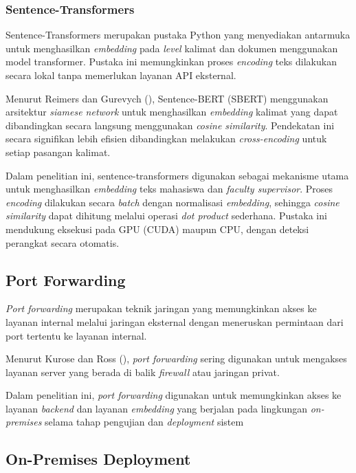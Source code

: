 \subsubsection{Sentence-Transformers}\label{sentence-transformers}

Sentence-Transformers merupakan pustaka Python yang menyediakan antarmuka untuk menghasilkan \textit{embedding} pada \textit{level} kalimat dan dokumen menggunakan model transformer. Pustaka ini memungkinkan proses \textit{encoding} teks dilakukan secara lokal tanpa memerlukan layanan API eksternal.

Menurut Reimers dan Gurevych (\citeyear{reimers2019sbert}), Sentence-BERT (SBERT) menggunakan arsitektur \textit{siamese network} untuk menghasilkan \textit{embedding} kalimat yang dapat dibandingkan secara langsung menggunakan \textit{cosine similarity}. Pendekatan ini secara signifikan lebih efisien dibandingkan melakukan \textit{cross-encoding} untuk setiap pasangan kalimat.

Dalam penelitian ini, sentence-transformers digunakan sebagai mekanisme utama untuk menghasilkan \textit{embedding} teks mahasiswa dan \textit{faculty supervisor}. Proses \textit{encoding} dilakukan secara \textit{batch} dengan normalisasi \textit{embedding}, sehingga \textit{cosine similarity} dapat dihitung melalui operasi \textit{dot product} sederhana. Pustaka ini mendukung eksekusi pada GPU (CUDA) maupun CPU, dengan deteksi perangkat secara otomatis.

\subsection{Port Forwarding}\label{port-forwarding}

\textit{Port forwarding} merupakan teknik jaringan yang memungkinkan akses ke layanan internal melalui jaringan eksternal dengan meneruskan permintaan dari port tertentu ke layanan internal.

Menurut Kurose dan Ross (\citeyear{kurose2017networking}), \textit{port forwarding} sering digunakan untuk mengakses layanan server yang berada di balik \textit{firewall} atau jaringan privat.

Dalam penelitian ini, \textit{port forwarding} digunakan untuk memungkinkan akses ke layanan \textit{backend} dan layanan \textit{embedding} yang berjalan pada lingkungan \textit{on-premises} selama tahap pengujian dan \textit{deployment} sistem

\subsection{On-Premises Deployment}\label{on-premises-deployment}

